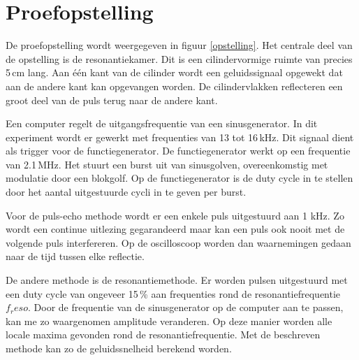 \section{Proefopstelling}


De proefopstelling wordt weergegeven in figuur \ref{opstelling}. Het centrale 
deel van de opstelling is de resonantiekamer. Dit is een cilindervormige ruimte 
van precies 5\,cm lang. Aan \'e\'en kant van de cilinder wordt een 
geluidssignaal opgewekt dat aan de andere kant kan opgevangen worden. De 
cilindervlakken reflecteren een groot deel van de puls terug naar de andere 
kant. 

Een computer regelt de uitgangsfrequentie van een sinusgenerator. In dit 
experiment wordt er gewerkt met frequenties van 13 tot 16\,kHz. Dit signaal 
dient als trigger voor de functiegenerator. De functiegenerator werkt op een 
frequentie van 2.1\,MHz. Het stuurt een burst uit van sinusgolven, 
overeenkomstig met modulatie door een blokgolf. Op de functiegenerator is de 
duty cycle in te stellen door het aantal uitgestuurde cycli in te geven per 
burst.

Voor de puls-echo methode wordt er een enkele puls uitgestuurd aan 1 kHz. Zo 
wordt een continue uitlezing gegarandeerd maar kan een puls ook nooit met de 
volgende puls interfereren. Op de oscilloscoop worden dan waarnemingen gedaan 
naar de tijd tussen elke reflectie.

De andere methode is de resonantiemethode. Er worden pulsen uitgestuurd met een 
duty cycle van ongeveer 15\,\% aan frequenties rond de resonantiefrequentie 
$f_reso$. Door de frequentie van de sinusgenerator op de computer aan te 
passen, kan me zo waargenomen amplitude veranderen. Op deze manier worden alle 
locale maxima gevonden rond de resonantiefrequentie. Met de beschreven methode 
kan zo de geluidssnelheid berekend worden. 
